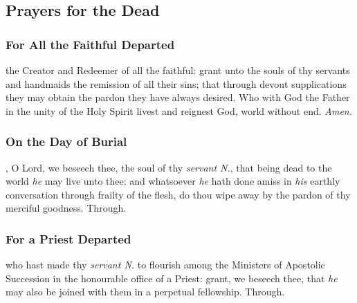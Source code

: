 


\clearpage
\subsection{Prayers for the Dead}\label{dead}
\subsubsection{For All the Faithful Departed}
 the Creator and Redeemer of all the faithful: grant unto the souls of thy servants and handmaids the remission of all their sins; that through devout supplications they may obtain the pardon they have always desired. Who with God the Father in the unity of the Holy Spirit livest and reignest God, world without end. \textit{Amen.}

\subsubsection{On the Day of Burial}
, O Lord, we beseech thee, the soul of thy \textit{servant N.}, that being dead to the world \textit{he} may live unto thee: and whatsoever \textit{he} hath done amiss in \textit{his} earthly conversation through frailty of the flesh, do thou wipe away by the pardon of thy merciful goodness. Through.

\subsubsection{For a Priest Departed}
 who hast made thy \textit{servant N.} to flourish among the Ministers of Apostolic Succession in the honourable office of a Priest: grant, we beseech thee, that \textit{he} may also be joined with them in a perpetual fellowship. Through.

